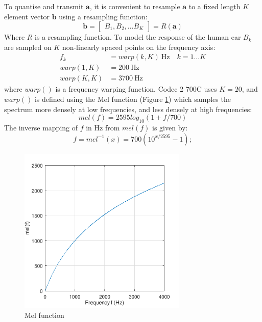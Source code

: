 \documentclass{article}
\begin{document}
To quantise and transmit $\mathbf{a}$, it is convenient to resample $\mathbf{a}$ to a fixed length $K$ element vector $\mathbf{b}$ using a resampling function:
\begin{equation}
\mathbf{b} = \begin{bmatrix} B_1, B_2, \ldots B_K \end{bmatrix} = R(\mathbf{a})
\end{equation}
Where $R$ is a resampling function. To model the response of the human ear $B_k$  are sampled on $K$ non-linearly spaced points on the frequency axis:
\begin{equation}
\begin{split}
f_k &= warp(k,K) \ \textrm{Hz} \quad k=1 \ldots K \\
warp(1,K) &= 200 \ \textrm{Hz} \\
warp(K,K) &= 3700 \ \textrm{Hz}
\end{split}
\end{equation}
where $warp()$ is a frequency warping function. Codec 2 700C uses $K=20$, and $warp()$ is defined using the Mel function \cite[p 150]{o1997human} (Figure \ref{fig:mel_fhz}) which samples the spectrum more densely at low frequencies, and less densely at high frequencies:
\begin{equation} \label{eq:mel_f}
mel(f) = 2595log_{10}(1+f/700)
\end{equation}
The inverse mapping of $f$ in Hz from $mel(f)$ is given by:
\begin{equation} \label{eq:f_mel}
f = mel^{-1}(x) = 700(10^{x/2595} - 1);
\end{equation}

\begin{figure}[h]
\caption{Mel function}
\label{fig:mel_fhz}
\begin{center}
\includegraphics[width=8cm]{ratek_mel_fhz}
\end{center}
\end{figure}
\end{document}
